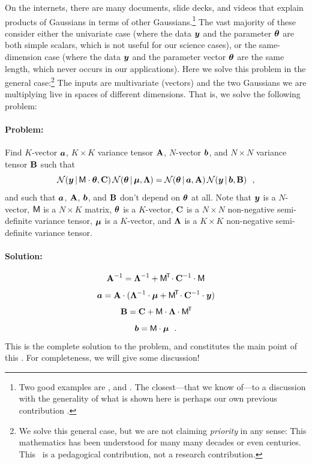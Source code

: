 On the internets, there are many documents, slide decks, and videos
that explain products of Gaussians in terms of other Gaussians.\footnote{Two
  good examples are \cite{roweis}, and \cite{cookbook}. The closest---that we know
  of---to a
  discussion with the generality of
  what is shown here is perhaps our own previous contribution \cite{luger}.}
The vast majority of these consider either the univariate case (where
the data $\boldsymbol{y}$ and the parameter $\boldsymbol{\theta}$ are both simple scalars, which
is not useful for our science cases), or the same-dimension case (where the data
$\boldsymbol{y}$ and the parameter vector $\boldsymbol{\theta}$ are the same length, which never
occurs in our applications).
Here we solve this problem in the general case:\footnote{We solve this general
  case, but we are not claiming \emph{priority} in any sense: This mathematics
  has been understood for many many decades or even centuries. This \documentname\ is
  a pedagogical contribution, not a research contribution.}
The inputs are multivariate (vectors) and the two Gaussians we are
multiplying live in spaces of different dimensions.
That is, we solve the following problem:

\paragraph{Problem:}
Find $K$-vector $\boldsymbol{a}$, $K\times K$ variance tensor $\mathbf{A}$, $N$-vector $\boldsymbol{b}$,
and $N\times N$ variance tensor $\mathbf{B}$ such that
\begin{equation}\label{eq:problem}
\mathcal{N}\!\,(\boldsymbol{y}\,|\,\mathsf{M}\cdot\boldsymbol{\theta},\mathbf{C})\,\mathcal{N}\!\,(\boldsymbol{\theta}\,|\,\boldsymbol{\mu},\mathbf{\Lambda})
 = \mathcal{N}\!\,(\boldsymbol{\theta}\,|\,\boldsymbol{a},\mathbf{A})\,\mathcal{N}\!\,(\boldsymbol{y}\,|\,\boldsymbol{b},\mathbf{B}) ~~,
\end{equation}
and such that $\boldsymbol{a}$, $\mathbf{A}$, $\boldsymbol{b}$, and $\mathbf{B}$ don't depend on $\boldsymbol{\theta}$ at all.
Note that
$\boldsymbol{y}$ is a $N$-vector,
$\mathsf{M}$ is a $N\times K$ matrix,
$\boldsymbol{\theta}$ is a $K$-vector,
$\mathbf{C}$ is a $N\times N$ non-negative semi-definite variance tensor,
$\boldsymbol{\mu}$ is a $K$-vector,
and
$\mathbf{\Lambda}$ is a $K\times K$ non-negative semi-definite variance tensor.

\paragraph{Solution:}
\begin{equation}\label{eq:A}
\mathbf{A}^{-1} = \mathbf{\Lambda}^{-1} + \mathsf{M}^{\!\mathsf{T}\!} \cdot \mathbf{C}^{-1} \cdot \mathsf{M}
\end{equation}
\begin{equation}\label{eq:a}
\boldsymbol{a} = \mathbf{A} \cdot (\mathbf{\Lambda}^{-1} \cdot \boldsymbol{\mu} + \mathsf{M}^{\!\mathsf{T}\!} \cdot \mathbf{C}^{-1} \cdot \boldsymbol{y})
\end{equation}
\begin{equation}\label{eq:B}
\mathbf{B} = \mathbf{C} + \mathsf{M} \cdot \mathbf{\Lambda} \cdot \mathsf{M}^{\!\mathsf{T}\!}
\end{equation}
\begin{equation}\label{eq:b}
\boldsymbol{b} = \mathsf{M} \cdot \boldsymbol{\mu}
~~.
\end{equation}
This is the complete solution to the problem, and constitutes the main point
of this \documentname.
For completeness, we will give some discussion!

